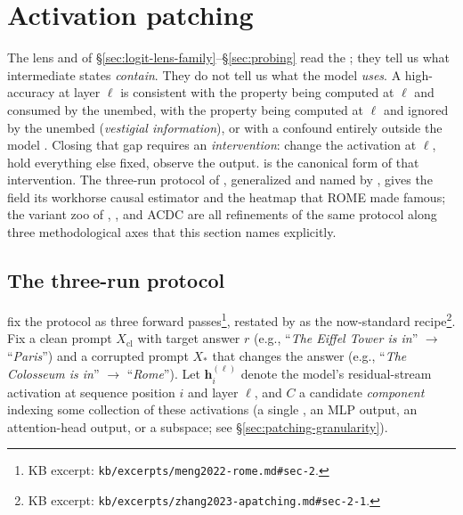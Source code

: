 
\section{Activation patching}
\label{sec:patching}

The lens and  of \S\ref{sec:logit-lens-family}--\S\ref{sec:probing}
read the ; they tell us what intermediate states
\emph{contain}. They do not tell us what the model \emph{uses}. A
high-accuracy  at layer $\ell$ is consistent with the property
being computed at $\ell$ and consumed by the unembed, with the property
being computed at $\ell$ and ignored by the unembed (\emph{vestigial
information}), or with a confound entirely outside the model
\citep{belinkov2022-probing-survey}. Closing that gap requires an
\emph{intervention}: change the activation at $\ell$, hold everything
else fixed, observe the output.  is the canonical
form of that intervention. The three-run protocol of
\citet{meng2022-rome}, generalized and named by
\citet{zhang2023-apatching}, gives the field its workhorse causal
estimator and the heatmap that ROME made famous; the variant zoo of
 \citep{wang2022-ioi}, , and ACDC
\citep{conmy2023-acdc} are all refinements of the same protocol along
three methodological axes that this section names explicitly.

\subsection{The three-run protocol}
\label{sec:patching-protocol}

\citet{meng2022-rome} fix the protocol as three forward
passes\footnote{KB excerpt:
\texttt{kb/excerpts/meng2022-rome.md\#sec-2}.}, restated by
\citet[\S 2.1]{zhang2023-apatching} as the now-standard
recipe\footnote{KB excerpt:
\texttt{kb/excerpts/zhang2023-apatching.md\#sec-2-1}.}. Fix a clean
prompt $X_{\text{cl}}$ with target answer $r$ (e.g.,
``\textit{The Eiffel Tower is in}'' $\to$ ``\textit{Paris}'') and a
corrupted prompt $X_{*}$ that changes the answer (e.g.,
``\textit{The Colosseum is in}'' $\to$ ``\textit{Rome}''). Let
$\mathbf{h}_i^{(\ell)}$ denote the model's residual-stream activation
at sequence position $i$ and layer $\ell$, and $C$ a candidate
\emph{component} indexing some collection of these activations
(a single , an MLP output, an attention-head output,
or a subspace; see \S\ref{sec:patching-granularity}).

